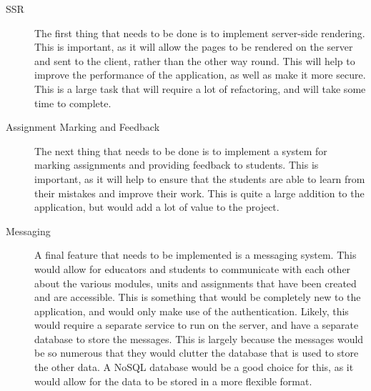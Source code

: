 \documentclass[11pt, a4paper,twoside]{report}
\theoremstyle{plain} %
\theoremstyle{definition} %
\numberwithin{equation}{chapter}
\begin{document}
\begin{description}

    \item[SSR] {
        The first thing that needs to be done is to implement server-side
        rendering. This is important, as it will allow the pages to be rendered
        on the server and sent to the client, rather than the other way round.
        This will help to improve the performance of the application, as well
        as make it more secure. This is a large task that will require a lot of
        refactoring, and will take some time to complete.
        }

    \item[Assignment Marking and Feedback] {
        The next thing that needs to be done is to implement a system for
        marking assignments and providing feedback to students. This is
        important, as it will help to ensure that the students are able to
        learn from their mistakes and improve their work. This is quite a
        large addition to the application, but would add a lot of value to the
        project.
        }

    \item[Messaging] {
        A final feature that needs to be implemented is a messaging system.
        This would allow for educators and students to communicate with each
        other about the various modules, units and assignments that have been
        created and are accessible. This is something that would be completely
        new to the application, and would only make use of the authentication.
        Likely, this would require a separate service to run on the server, and
        have a separate database to store the messages. This is largely because
        the messages would be so numerous that they would clutter the database
        that is used to store the other data. A NoSQL database would be a good
        choice for this, as it would allow for the data to be stored in a more
        flexible format.
        }

\end{description}



\end{document}
